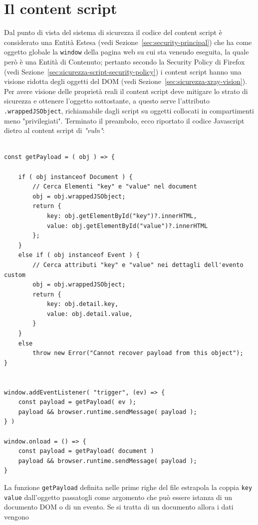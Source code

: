 \documentclass{sapthesis}
\newcommand{\code}[1]{\texttt{#1}}
\newcommand{\attr}[1]{\code{.#1}}
\newcommand{\refSection}[1]{Sezione~\ref{#1}}
\newcommand{\vuln}{\textit{"vuln"}}
\newcommand{\JS}{Javascript }
\begin{document}
    \section{Il content script}
    \label{sec:analisi-vuln-content-script}
        Dal punto di vista del sistema di sicurezza il codice del content script è considerato
        una Entità Estesa (vedi \refSection{sec:security-principal}) che ha come oggetto
        globale la \code{window} della pagina web su cui sta venendo eseguita, la quale
        però è una Entità di Contenuto; pertanto secondo la Security Policy di Firefox (vedi \refSection{sec:sicurezza-script-security-policy})
        i content script hanno una visione ridotta degli oggetti del DOM (vedi \refSection{sec:sicurezza-xray-vision}).
        Per avere visione delle proprietà reali il content script deve mitigare lo strato
        di sicurezza e ottenere l'oggetto sottostante, a questo serve l'attributo \attr{wrappedJSObject},
        richiamabile dagli script su oggetti collocati in compartimenti meno "privilegiati".
        Terminato il preambolo, ecco riportato il codice \JS dietro al content script di \vuln:
        \begin{lstlisting}

const getPayload = ( obj ) => {

    if ( obj instanceof Document ) {
        // Cerca Elementi "key" e "value" nel document
        obj = obj.wrappedJSObject;
        return { 
            key: obj.getElementById("key")?.innerHTML, 
            value: obj.getElementById("value")?.innerHTML 
        };
    }
    else if ( obj instanceof Event ) {
        // Cerca attributi "key" e "value" nei dettagli dell'evento custom
        obj = obj.wrappedJSObject;
        return {
            key: obj.detail.key,
            value: obj.detail.value,
        }
    }
    else
        throw new Error("Cannot recover payload from this object");
}


window.addEventListener( "trigger", (ev) => {
    const payload = getPayload( ev );
    payload && browser.runtime.sendMessage( payload );
} )

window.onload = () => {
    const payload = getPayload( document )
    payload && browser.runtime.sendMessage( payload );
}

        \end{lstlisting}
        La funzione \code{getPayload} definita nelle prime righe del file estrapola la coppia
        \code{key} \code{value} dall'oggetto passatogli come argomento che può essere istanza
        di un documento DOM o di un evento. Se si tratta di un documento allora i dati vengono
\end{document}

